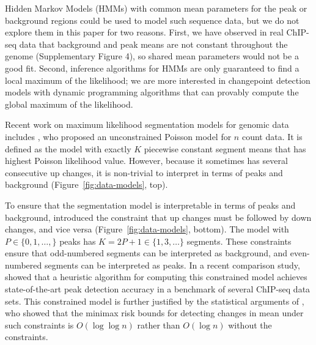 \documentclass[aoas]{imsart}
\begin{document}
Hidden Markov Models (HMMs) with common mean parameters for the peak
or background regions could be used to model such sequence data, but
we do not explore them in this paper for two reasons. First, we have
observed in real ChIP-seq data that background and peak means are not
constant throughout the genome (Supplementary Figure 4), so shared
mean parameters would not be a good fit. Second, inference algorithms
for HMMs are only guaranteed to find a local maximum of the
likelihood; we are more interested in changepoint detection models
with dynamic programming algorithms that can provably compute the
global maximum of the likelihood.

Recent work on maximum likelihood segmentation models for genomic data
includes \citet{cleynen2013segmentation}, who proposed an
unconstrained Poisson model for $n$ count data. It is defined as the
model with exactly $K$ piecewise constant segment means that has
highest Poisson likelihood value. However, because it sometimes has
several consecutive up changes, it is non-trivial to interpret in
terms of peaks and background (Figure~\ref{fig:data-models}, top).

To ensure that the segmentation model is interpretable in terms of
peaks and background, \citet{HOCKING-PeakSeg} introduced the 
constraint that up changes must be followed by down changes, and vice
versa (Figure~\ref{fig:data-models}, bottom). The model with
$P\in\{0,1,\dots, \}$ peaks has $K=2P+1\in\{1, 3, \dots\}$
segments. These constraints ensure that odd-numbered segments can be
interpreted as background, and even-numbered segments can be
interpreted as peaks.
In a recent comparison study, \citet{HOCKING2016-chipseq} showed that
a heuristic algorithm for computing this constrained model achieves
state-of-the-art peak detection accuracy in a benchmark of several
ChIP-seq data sets. This constrained model is further justified by the
statistical arguments of \citet{minimax-changepoint}, who showed that
the minimax risk bounds for detecting changes in mean under such
constraints is $O(\log \log n)$ rather than $O(\log n)$ without the
constraints. 

\end{document}
